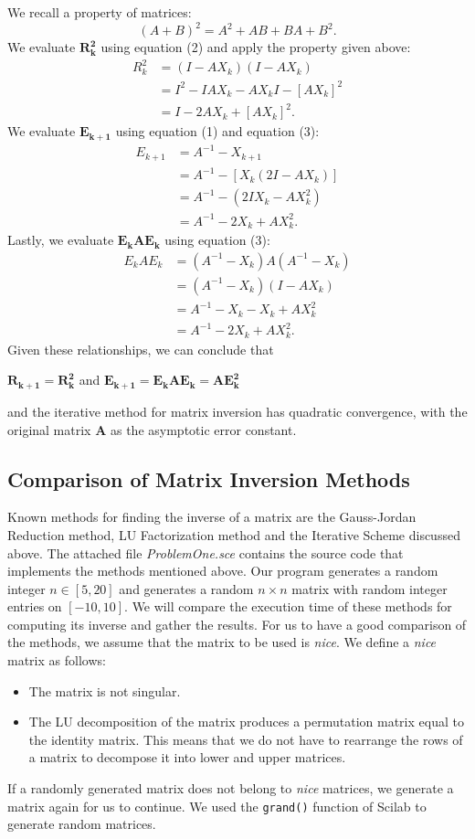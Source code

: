 \documentclass[a4paper]{article}
\begin{document}
			We recall a property of matrices:
			$$
				(A+B)^{2} = A^{2}+ AB + BA + B^{2}.
			$$
			We evaluate $\mathbf{R_{k}^{2}}$ using equation (2) and apply the property given above:
			$$
			\begin{aligned}
					R_{k}^{2}&=(I-AX_{k})(I-AX_{k})\\
					&=I^{2}-IAX_{k}-AX_{k}I-[AX_{k}]^{2}\\
					&=I-2AX_{k}+[AX_{k}]^{2}.
			\end{aligned}
			$$
			We evaluate $\mathbf{E_{k+1}}$ using equation (1) and equation (3):
			$$
			\begin{aligned}
				E_{k+1}&=A^{-1}-X_{k+1}\\
				&=A^{-1}-[X_{k}(2I-AX_{k})]\\
				&=A^{-1}-(2IX_{k}-AX^{2}_{k})\\
				&=A^{-1}-2X_{k}+AX_{k}^{2}.
			\end{aligned}
			$$
			Lastly, we evaluate $\mathbf{E_{k}AE_{k}}$ using equation (3):
			$$\begin{aligned}
				E_{k}AE_{k}&=(A^{-1}-X_{k})A(A^{-1}-X_{k})\\
				&=(A^{-1}-X_{k})(I-AX_{k})\\
				&=A^{-1}-X_{k}-X_{k}+AX_{k}^2\\
				&=A^{-1}-2X_{k}+AX_{k}^2.
			\end{aligned}$$
			Given these relationships, we can conclude that
			\begin{center}
				$\mathbf{R_{k+1}=R_{k}^{2}}$ and $\mathbf{E_{k+1}=E_{k}AE_{k}=AE_{k}^{2}}$
			\end{center}
			and the iterative method for matrix inversion has quadratic convergence, with the original matrix $\mathbf{A}$ as the asymptotic error constant.
		\subsection{Comparison of Matrix Inversion Methods}
			Known methods for finding the inverse of a matrix are the Gauss-Jordan Reduction method, LU Factorization method and the Iterative Scheme discussed above.
			The attached file \textit{ProblemOne.sce} contains the source code that implements the methods mentioned above.
			Our program generates a random integer $n\in[5, 20]$ and generates a random $n\times{}n$ matrix with random integer entries on $[-10, 10]$.
			We will compare the execution time of these methods for computing its inverse and gather the results.
			For us to have a good comparison of the methods, we assume that the matrix to be used is \textit{nice}. We define a \textit{nice} matrix as follows:
			\begin{itemize}
				\item The matrix is not singular.
				\item The LU decomposition of the matrix produces a permutation matrix equal to the identity matrix. This means that we do not have to rearrange the rows of a matrix to decompose it into lower and upper matrices.
			\end{itemize}
			If a randomly generated matrix does not belong to \textit{nice} matrices, we generate a matrix again for us to continue.
			We used the \texttt{grand()} function of Scilab to generate random matrices.
\end{document}
